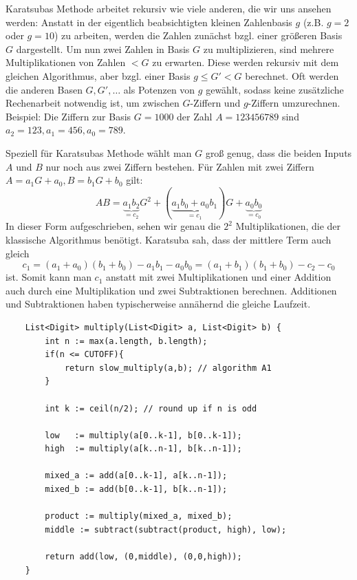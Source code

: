 \begin{remark}
    Karatsubas Methode arbeitet rekursiv wie viele anderen, die wir uns ansehen werden: Anstatt in der eigentlich beabsichtigten kleinen Zahlenbasis $g$ (z.B. $g=2$ oder $g=10$) zu arbeiten, werden die Zahlen zunächst bzgl. einer größeren Basis $G$ dargestellt. Um nun zwei Zahlen in Basis $G$ zu multiplizieren, sind mehrere Multiplikationen von Zahlen $<G$ zu erwarten. Diese werden rekursiv mit dem gleichen Algorithmus, aber bzgl. einer Basis $g\leq G'<G$ berechnet. Oft werden die anderen Basen $G,G', \ldots$ als Potenzen von $g$ gewählt, sodass keine zusätzliche Rechenarbeit notwendig ist, um zwischen $G$-Ziffern und $g$-Ziffern umzurechnen. Beispiel: Die Ziffern zur Basis $G=1000$ der Zahl $A=123456789$ sind $a_2=123, a_1=456, a_0=789$.

    \medskip
    Speziell für Karatsubas Methode wählt man $G$ groß genug, dass die beiden Inputs $A$ und $B$ nur noch aus zwei Ziffern bestehen. Für Zahlen mit zwei Ziffern $A=a_1G+a_0, B=b_1G+b_0$ gilt:
    \[AB = \underbrace{a_1 b_2}_{=c_2} G^2 + (\underbrace{a_1 b_0+a_0 b_1}_{=c_1})G+\underbrace{a_0 b_0}_{=c_0}\]
    In dieser Form aufgeschrieben, sehen wir genau die $2^2$ Multiplikationen, die der klassische Algorithmus benötigt. Karatsuba sah, dass der mittlere Term auch gleich
    \[c_1 = (a_1+a_0)(b_1+b_0)-a_1 b_1-a_0b_0 = (a_1+b_1)(b_1+b_0)-c_2-c_0\]
    ist. Somit kann man $c_1$ anstatt mit zwei Multiplikationen und einer Addition auch durch eine Multiplikation und zwei Subtraktionen berechnen. Additionen und Subtraktionen haben typischerweise annähernd die gleiche Laufzeit.
\end{remark}

\begin{algorithm}
    \label{alg:karatsuba}
    \begin{lstlisting}
    List<Digit> multiply(List<Digit> a, List<Digit> b) {
        int n := max(a.length, b.length);
        if(n <= CUTOFF){
            return slow_multiply(a,b); // algorithm A1
        }
    
        int k := ceil(n/2); // round up if n is odd
        
        low   := multiply(a[0..k-1], b[0..k-1]);
        high  := multiply(a[k..n-1], b[k..n-1]);
        
        mixed_a := add(a[0..k-1], a[k..n-1]);
        mixed_b := add(b[0..k-1], b[k..n-1]);
        
        product := multiply(mixed_a, mixed_b);
        middle := subtract(subtract(product, high), low);
        
        return add(low, (0,middle), (0,0,high));
    }
    \end{lstlisting}
\end{algorithm}

